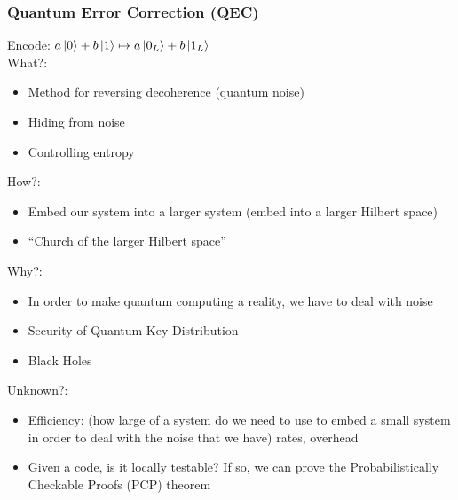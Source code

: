\subsubsection{Quantum Error Correction (QEC)}
Encode: $a\ket{0} + b\ket{1} \mapsto a \ket{0_L} + b \ket{1_L}$ \\
What?: 
\begin{itemize}
    \item Method for reversing decoherence (quantum noise)
    \item Hiding from noise
    \item Controlling entropy
\end{itemize}
How?:
\begin{itemize}
    \item Embed our system into a larger system (embed into a larger Hilbert space)
    \item ``Church of the larger Hilbert space''
\end{itemize}
Why?:
\begin{itemize}
    \item In order to make quantum computing a reality, we have to deal with noise
    \item Security of Quantum Key Distribution
    \item Black Holes
\end{itemize}
Unknown?:
\begin{itemize}
    \item Efficiency: (how large of a system do we need to use to embed a small system in order to deal with the noise that we have) rates, overhead
    \item Given a code, is it locally testable? If so, we can prove the Probabilistically Checkable Proofs (PCP) theorem 
\end{itemize}



